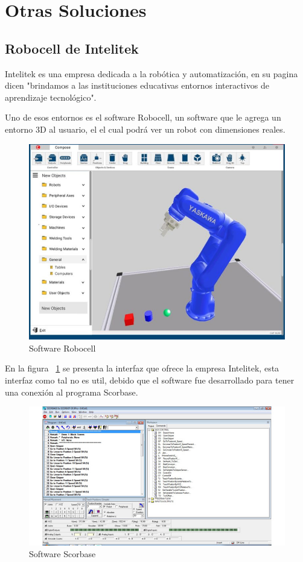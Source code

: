 \section{Otras Soluciones}
\subsection{Robocell de Intelitek}
Intelitek es una empresa dedicada a la robótica y automatización, en su pagina dicen "brindamos a las instituciones educativas entornos interactivos de aprendizaje tecnológico". 

Uno de esos entornos es el software Robocell, un software que le agrega un entorno 3D al usuario, el el cual podrá ver un robot con dimensiones reales.
\begin{figure}[h]
\centering
\includegraphics[width=13cm]{figures/Robocell-768x588-1.jpg}
\caption{Software Robocell}
\label{fig:robocell}
\end{figure}

En la figura ~\ref{fig:robocell} se presenta la interfaz que ofrece la empresa Intelitek, esta interfaz como tal no es util, debido que el software fue desarrollado para tener una conexión al programa Scorbase.
\clearpage 

\begin{figure}[h]
\centering
\includegraphics[width=13cm]{figures/eL_RBTC_P_ScorbaseControllerUSBPro_644x350.jpg}
\caption{Software Scorbase}
\label{fig:scorbase}
\end{figure}

